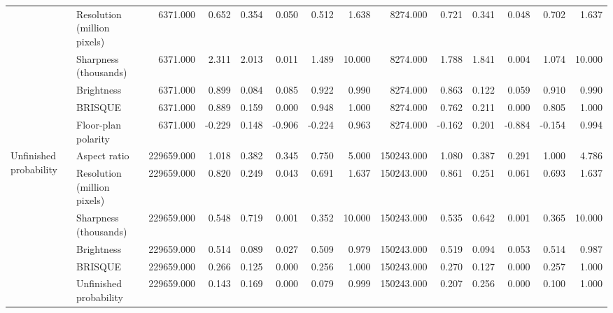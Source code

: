 \begin{tabular}{llrrrrrrrrrrrr}
 & Resolution (million pixels) & 6371.000 & 0.652 & 0.354 & 0.050 & 0.512 & 1.638 & 8274.000 & 0.721 & 0.341 & 0.048 & 0.702 & 1.637 \\
 & Sharpness (thousands) & 6371.000 & 2.311 & 2.013 & 0.011 & 1.489 & 10.000 & 8274.000 & 1.788 & 1.841 & 0.004 & 1.074 & 10.000 \\
 & Brightness & 6371.000 & 0.899 & 0.084 & 0.085 & 0.922 & 0.990 & 8274.000 & 0.863 & 0.122 & 0.059 & 0.910 & 0.990 \\
 & BRISQUE & 6371.000 & 0.889 & 0.159 & 0.000 & 0.948 & 1.000 & 8274.000 & 0.762 & 0.211 & 0.000 & 0.805 & 1.000 \\
 & Floor-plan polarity & 6371.000 & -0.229 & 0.148 & -0.906 & -0.224 & 0.963 & 8274.000 & -0.162 & 0.201 & -0.884 & -0.154 & 0.994 \\
\cline{1-14}
\multirow[t]{6}{*}{Unfinished probability} & Aspect ratio & 229659.000 & 1.018 & 0.382 & 0.345 & 0.750 & 5.000 & 150243.000 & 1.080 & 0.387 & 0.291 & 1.000 & 4.786 \\
 & Resolution (million pixels) & 229659.000 & 0.820 & 0.249 & 0.043 & 0.691 & 1.637 & 150243.000 & 0.861 & 0.251 & 0.061 & 0.693 & 1.637 \\
 & Sharpness (thousands) & 229659.000 & 0.548 & 0.719 & 0.001 & 0.352 & 10.000 & 150243.000 & 0.535 & 0.642 & 0.001 & 0.365 & 10.000 \\
 & Brightness & 229659.000 & 0.514 & 0.089 & 0.027 & 0.509 & 0.979 & 150243.000 & 0.519 & 0.094 & 0.053 & 0.514 & 0.987 \\
 & BRISQUE & 229659.000 & 0.266 & 0.125 & 0.000 & 0.256 & 1.000 & 150243.000 & 0.270 & 0.127 & 0.000 & 0.257 & 1.000 \\
 & Unfinished probability & 229659.000 & 0.143 & 0.169 & 0.000 & 0.079 & 0.999 & 150243.000 & 0.207 & 0.256 & 0.000 & 0.100 & 1.000 \\
\cline{1-14}
\bottomrule
\end{tabular}
